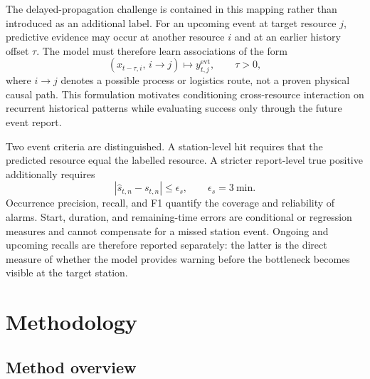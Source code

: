 \documentclass[a4paper,fleqn]{cas-dc}
\begin{document}
The delayed-propagation challenge is contained in this mapping rather than introduced as an additional label. For an upcoming event at target resource $j$, predictive evidence may occur at another resource $i$ and at an earlier history offset $\tau$. The model must therefore learn associations of the form
\begin{equation}
(x_{t-\tau,i},\,i\!\rightarrow\!j)\longmapsto y^{\mathrm{evt}}_{t,j},
\qquad \tau>0,
\end{equation}
where $i\!\rightarrow\!j$ denotes a possible process or logistics route, not a proven physical causal path. This formulation motivates conditioning cross-resource interaction on recurrent historical patterns while evaluating success only through the future event report.


Two event criteria are distinguished. A station-level hit requires that the predicted resource equal the labelled resource. A stricter report-level true positive additionally requires
\begin{equation}
|\hat{s}_{t,n}-s_{t,n}|\leq\epsilon_s,\qquad
\epsilon_s=3~\mathrm{min}.
\end{equation}
Occurrence precision, recall, and F1 quantify the coverage and reliability of alarms. Start, duration, and remaining-time errors are conditional or regression measures and cannot compensate for a missed station event. Ongoing and upcoming recalls are therefore reported separately: the latter is the direct measure of whether the model provides warning before the bottleneck becomes visible at the target station.


\section{Methodology} \label{sec:method}

\subsection{Method overview}
\end{document}
